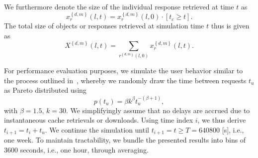 \documentclass[letterpaper,journal,onecolumn,draftcls]{IEEEtran}
\begin{document}
We furthermore denote the size of the individual response retrieved at time $t$ as 
\begin{equation}
x_{r}^{\left\{ d,m \right\}}(l,t) = x_{r}^{\left\{ d,m \right\}}(l,0) \cdot \left[ t_c \ge t \right].
\end{equation}
The total size of objects or responses retrieved at simulation time $t$ thus is given as 
\begin{equation}
X^{\left\{ d,m \right\}}(l,t) =\sum_{r^{\left\{ d,m \right\}}(l,0)} x_{r}^{\left\{ d,m \right\}}(l,t).
\end{equation}


For performance evaluation purposes, we simulate the user behavior similar to the process outlined in~\cite{AnCoGrPa03}, whereby we randomly draw the time between requests $t_u$ as Pareto distributed using
\begin{equation}
p(t_u)=\beta k^\beta t_u^{-(\beta+1)},
\end{equation}
 with $\beta=1.5$, $k=30$.
We simplifyingly assume that no delays are accrued due to instantaneous cache retrievals or downloads. 
Using time index $i$, we thus derive $t_{i+1}=t_i + t_u$.
We continue the simulation until $t_{i+1} = t \ge T =  640800$ [s], i.e., one week.
To maintain tractability, we bundle the presented results into bins of 3600 seconds, i.e., one hour, through averaging.


%
%
%
\end{document}
